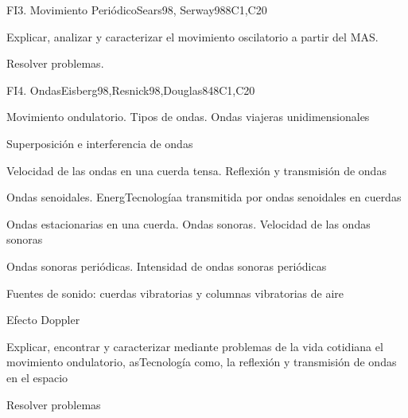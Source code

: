 \begin{syllabus}
\begin{unit}{FI3. Movimiento Periódico}{Sears98, Serway98}{}{8}{C1,C20}
   \begin{learningoutcomes}
         \item  Explicar, analizar y caracterizar el movimiento oscilatorio a partir del MAS.
         \item  Resolver problemas.
   \end{learningoutcomes}
\end{unit}

\begin{unit}{FI4. Ondas}{Eisberg98,Resnick98,Douglas84}{}{8}{C1,C20}
\begin{topics}
         \item  Movimiento ondulatorio. Tipos de ondas. Ondas viajeras unidimensionales
	 \item  Superposición e interferencia de ondas
         \item  Velocidad de las ondas en una cuerda tensa. Reflexión y transmisión de ondas
	 \item  Ondas senoidales. EnergTecnologíaa transmitida por ondas senoidales en cuerdas
         \item  Ondas estacionarias en una cuerda. Ondas sonoras. Velocidad de las ondas sonoras
	 \item  Ondas sonoras periódicas. Intensidad de ondas sonoras periódicas
	 \item  Fuentes de sonido: cuerdas vibratorias y columnas vibratorias de aire
	 \item  Efecto Doppler
   \end{topics}

   \begin{learningoutcomes}
         \item  Explicar, encontrar y caracterizar mediante problemas de la vida cotidiana el movimiento ondulatorio, asTecnología como, la reflexión y transmisión de ondas en el espacio
         \item  Resolver problemas
   \end{learningoutcomes}
\end{unit}


\end{syllabus}
